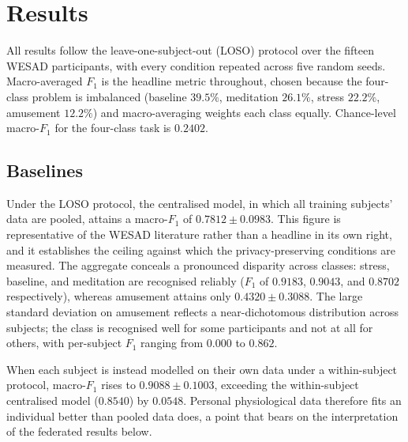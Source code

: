 
\section{Results}
\label{sec:results}

All results follow the leave-one-subject-out (LOSO) protocol over the fifteen
WESAD participants, with every condition repeated across five random seeds.
Macro-averaged $F_1$ is the headline metric throughout, chosen because the
four-class problem is imbalanced (baseline $39.5\%$, meditation $26.1\%$, stress
$22.2\%$, amusement $12.2\%$) and macro-averaging weights each class equally.
Chance-level macro-$F_1$ for the four-class task is $0.2402$.

\subsection{Baselines}
\label{sec:results-baselines}

Under the LOSO protocol, the centralised model, in which all training subjects'
data are pooled, attains a macro-$F_1$ of $0.7812 \pm 0.0983$. This figure is
representative of the WESAD literature rather than a headline in its own right,
and it establishes the ceiling against which the privacy-preserving conditions
are measured. The aggregate conceals a pronounced disparity across classes:
stress, baseline, and meditation are recognised reliably ($F_1$ of $0.9183$,
$0.9043$, and $0.8702$ respectively), whereas amusement attains only
$0.4320 \pm 0.3088$. The large standard deviation on amusement reflects a
near-dichotomous distribution across subjects; the class is recognised well for
some participants and not at all for others, with per-subject $F_1$ ranging from
$0.000$ to $0.862$.

When each subject is instead modelled on their own data under a within-subject
protocol, macro-$F_1$ rises to $0.9088 \pm 0.1003$, exceeding the within-subject
centralised model ($0.8540$) by $0.0548$. Personal physiological data therefore
fits an individual better than pooled data does, a point that bears on the
interpretation of the federated results below.

